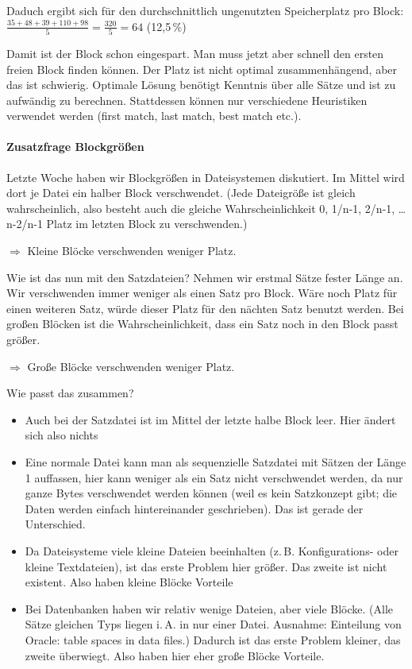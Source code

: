 \begin{enumerate}[a)]
\begin{solution}
	Daduch ergibt sich für den durchschnittlich ungenutzten Speicherplatz pro Block: $\frac{35+48+39+110+98}{5} = \frac{320}{5} = 64$  (12,5\,\%)

	Damit ist der Block schon eingespart. Man muss jetzt aber schnell den ersten freien Block finden können. Der Platz ist nicht optimal zusammenhängend, aber das ist schwierig. Optimale Lösung benötigt Kenntnis über alle Sätze und ist zu aufwändig zu berechnen. Stattdessen können nur verschiedene Heuristiken verwendet werden (first match, last match, best match etc.).

	\paragraph{Zusatzfrage Blockgrößen}
	Letzte Woche haben wir Blockgrößen in Dateisystemen diskutiert. Im Mittel wird dort je Datei ein halber Block verschwendet. (Jede Dateigröße ist gleich wahrscheinlich, also besteht auch die gleiche Wahrscheinlichkeit 0, 1/n-1, 2/n-1, \ldots n-2/n-1 Platz im letzten Block zu verschwenden.)

	$\Rightarrow$ Kleine Blöcke verschwenden weniger Platz.

	Wie ist das nun mit den Satzdateien? Nehmen wir erstmal Sätze fester Länge an. %
	Wir verschwenden immer weniger als einen Satz pro Block. Wäre noch Platz f\"ur einen weiteren Satz, w\"urde dieser Platz f\"ur den n\"achten Satz benutzt werden.
	Bei großen Blöcken ist die Wahrscheinlichkeit, dass ein Satz noch in den Block passt größer.

	$\Rightarrow$ Große Blöcke verschwenden weniger Platz.

	Wie passt das zusammen?
	\begin{itemize}
		\item Auch bei der Satzdatei ist im Mittel der letzte halbe Block leer. Hier ändert sich also nichts
		\item Eine normale Datei kann man als sequenzielle Satzdatei mit Sätzen der Länge 1 auffassen,
				hier kann weniger als ein Satz nicht verschwendet werden, da nur ganze Bytes verschwendet werden k\"onnen
				(weil es kein Satzkonzept gibt; die Daten werden einfach hintereinander geschrieben). Das ist gerade der Unterschied.
		\item Da Dateisysteme viele kleine Dateien beeinhalten (z.\,B. Konfigurations- oder kleine Textdateien), ist das erste Problem hier größer. Das zweite ist nicht existent. Also haben kleine Blöcke Vorteile
		\item Bei Datenbanken haben wir relativ wenige Dateien, aber viele Blöcke. (Alle Sätze gleichen Typs liegen i.\,A. in nur einer Datei. Ausnahme: Einteilung von Oracle: table spaces in data files.) Dadurch ist das erste Problem kleiner, das zweite überwiegt. Also haben hier eher große Blöcke Vorteile.
	\end{itemize}
	\end{solution}
\end{enumerate}



